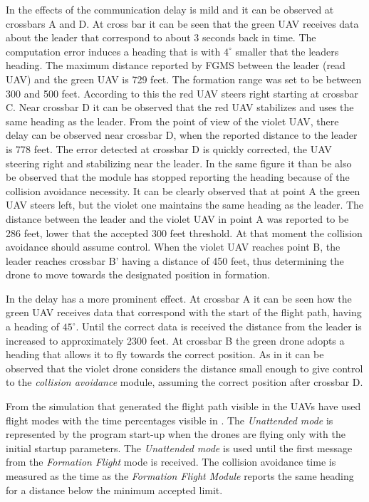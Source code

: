 
\newpage
In  the effects of the communication delay
is mild and it can be observed at crossbars A and D. At cross bar it can
be seen that the green UAV receives data about the leader that correspond to 
about 3 seconds back in time. The computation error induces a heading that is 
with $4^{\circ}$ smaller that the leaders heading. The maximum distance reported
by FGMS between the leader (read UAV) and the green UAV is 729 feet. The formation
range was set to be between 300 and 500 feet. According to this the red UAV
steers right starting at crossbar C. Near crossbar D it can be observed that 
the red UAV stabilizes and uses the same heading as the leader. From the point
of view of the violet UAV, there delay can be observed near crossbar D, when
the reported distance to the leader is 778 feet. The error detected at crossbar 
D is quickly corrected, the UAV steering right and stabilizing near the leader.
In the same figure it than be also be observed that the module has stopped reporting
the heading because of the collision avoidance necessity. It can be clearly observed
that at point A the green UAV steers left, but the violet one maintains the
same heading as the leader. The distance between the leader and the violet UAV
in point A was reported to be 286 feet, lower that the accepted 300 feet threshold.
At that moment the collision avoidance should assume control. When the violet UAV
reaches point B,  the leader reaches crossbar B' having a distance of 450 feet, 
thus determining the drone to move towards the designated position in formation.

In  the delay has a more prominent effect.
At crossbar A it can be seen how the green UAV receives data that correspond
with the start of the flight path, having a heading of $45^{\circ}$. Until the
correct data is received the distance from the leader is increased to approximately
2300 feet. At crossbar B the green drone adopts a heading that allows it to fly
towards the correct position. As in  
it can be observed that the violet drone considers the distance small enough
to give control to the \textit{collision avoidance} module,  assuming
the correct position after crossbar D.

From the simulation that generated the flight path visible in 
 the UAVs have used flight modes with the 
time percentages visible in . The
\textit{Unattended mode} is represented by the program start-up when the 
drones are flying only with the initial startup parameters. The \textit{Unattended mode}
is used until the first message from the \textit{Formation Flight} mode is received.
The collision avoidance time is measured as the time as the \textit{Formation
Flight Module} reports the same heading for a distance below the minimum accepted
limit.

